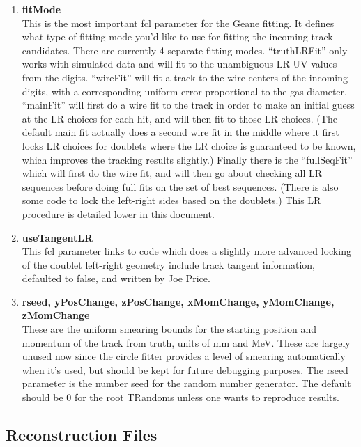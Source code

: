 \begin{enumerate}
      \item{\bf{fitMode}} \\
      This is the most important fcl parameter for the Geane fitting. It defines what type of fitting mode you'd like to use for fitting the incoming track candidates. There are currently 4 separate fitting modes. ``truthLRFit'' only works with simulated data and will fit to the unambiguous LR UV values from the digits. ``wireFit'' will fit a track to the wire centers of the incoming digits, with a corresponding uniform error proportional to the gas diameter. ``mainFit'' will first do a wire fit to the track in order to make an initial guess at the LR choices for each hit, and will then fit to those LR choices. (The default main fit actually does a second wire fit in the middle where it first locks LR choices for doublets where the LR choice is guaranteed to be known, which improves the tracking results slightly.) Finally there is the ``fullSeqFit'' which will first do the wire fit, and will then go about checking all LR sequences before doing full fits on the set of best sequences. (There is also some code to lock the left-right sides based on the doublets.) This LR procedure is detailed lower in this document.

      \item{\bf{useTangentLR}} \\
      This fcl parameter links to code which does a slightly more advanced locking of the doublet left-right geometry include track tangent information, defaulted to false, and written by Joe Price.

      \item{\bf{rseed, yPosChange, zPosChange, xMomChange, yMomChange, zMomChange}} \\
      These are the uniform smearing bounds for the starting position and momentum of the track from truth, units of mm and MeV. These are largely unused now since the circle fitter provides a level of smearing automatically when it's used, but should be kept for future debugging purposes. The rseed parameter is the number seed for the random number generator. The default should be 0 for the root TRandoms unless one wants to reproduce results.

    \end{enumerate}


  \subsection{Reconstruction Files}

